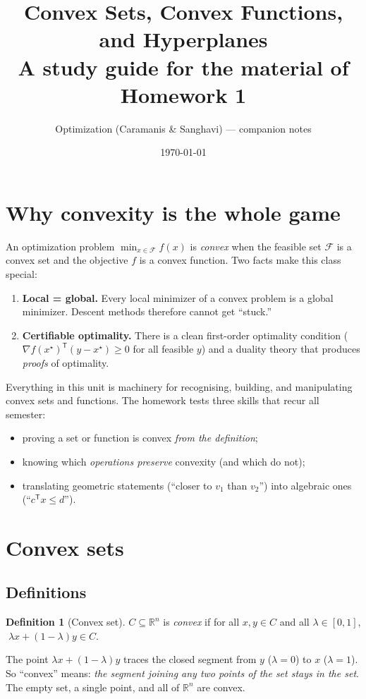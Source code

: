 \documentclass[11pt]{article}
\title{Convex Sets, Convex Functions, and Hyperplanes\\ \large A study guide for the material of Homework 1}
\author{Optimization (Caramanis \& Sanghavi) --- companion notes}
\date{\today}
\newcommand{\R}{\mathbb{R}}
\newcommand{\T}{^{\mathsf T}}
\newcommand{\lam}{\lambda}
\theoremstyle{definition}
\newtheorem{definition}{Definition}[section]
\theoremstyle{plain}
\theoremstyle{remark}
\begin{document}
\maketitle

\tableofcontents
\bigskip

\section{Why convexity is the whole game}

An optimization problem $\min_{x\in\mathcal F} f(x)$ is \emph{convex} when the feasible set $\mathcal F$ is a convex set and the objective $f$ is a convex function. Two facts make this class special:
\begin{enumerate}
\item \textbf{Local = global.} Every local minimizer of a convex problem is a global minimizer. Descent methods therefore cannot get ``stuck.''
\item \textbf{Certifiable optimality.} There is a clean first-order optimality condition ($\nabla f(x^\star)\T(y-x^\star)\ge0$ for all feasible $y$) and a duality theory that produces \emph{proofs} of optimality.
\end{enumerate}
Everything in this unit is machinery for recognising, building, and manipulating convex sets and functions. The homework tests three skills that recur all semester:
\begin{itemize}
\item proving a set or function is convex \emph{from the definition};
\item knowing which \emph{operations preserve} convexity (and which do not);
\item translating geometric statements (``closer to $v_1$ than $v_2$'') into algebraic ones (``$c\T x\le d$'').
\end{itemize}

\section{Convex sets}

\subsection{Definitions}

\begin{definition}[Convex set]
$C\subseteq\R^n$ is \emph{convex} if for all $x,y\in C$ and all $\lam\in[0,1]$, $\;\lam x+(1-\lam)y\in C$.
\end{definition}
The point $\lam x+(1-\lam)y$ traces the closed segment from $y$ ($\lam=0$) to $x$ ($\lam=1$). So ``convex'' means: \emph{the segment joining any two points of the set stays in the set}. The empty set, a single point, and all of $\R^n$ are convex.
\end{document}
